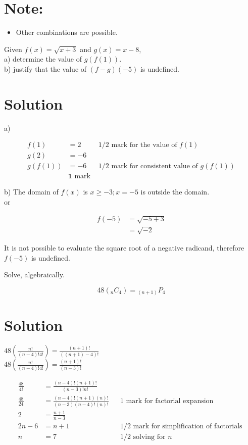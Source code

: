 \documentclass[10pt]{article}
\begin{document}
\section*{Note:}
\begin{itemize}
  \item Other combinations are possible.
\end{itemize}

Given $f(x)=\sqrt{x+3}$ and $g(x)=x-8$,\\
a) determine the value of $g(f(1))$.\\
b) justify that the value of $(f-g)(-5)$ is undefined.

\section*{Solution}
a)

$$
\begin{array}{rlr}
f(1) & =2 & 1 / 2 \text { mark for the value of } f(1) \\
g(2) & =-6 & \\
g(f(1)) & =-6 & 1 / 2 \text { mark for consistent value of } g(f(1)) \\
& \mathbf{1} \text { mark }
\end{array}
$$

b) The domain of $f(x)$ is $x \geq-3 ; x=-5$ is outside the domain.\\
or

$$
\begin{aligned}
f(-5) & =\sqrt{-5+3} \\
& =\sqrt{-2}
\end{aligned}
$$

It is not possible to evaluate the square root of a negative radicand, therefore $f(-5)$ is undefined.

Solve, algebraically.

$$
48\left({ }_{n} C_{4}\right)={ }_{(n+1)} P_{4}
$$

\section*{Solution}
$48\left(\frac{n!}{(n-4)!4!}\right)=\frac{(n+1)!}{((n+1)-4)!}$\\
$48\left(\frac{n!}{(n-4)!4!}\right)=\frac{(n+1)!}{(n-3)!}$

$$
\begin{array}{rlrl}
\frac{48}{4!} & =\frac{(n-4)!(n+1)!}{(n-3)!n!} & \\
\frac{48}{24} & =\frac{(n-4)!(n+1)(n)!}{(n-3)(n-4)!(n)!} & & 1 \text { mark for factorial expansion } \\
2 & =\frac{n+1}{n-3} & & \\
2 n-6 & =n+1 & & 1 / 2 \text { mark for simplification of factorials } \\
n & =7 & & 1 / 2 \text { solving for } n
\end{array}
$$
\end{document}

